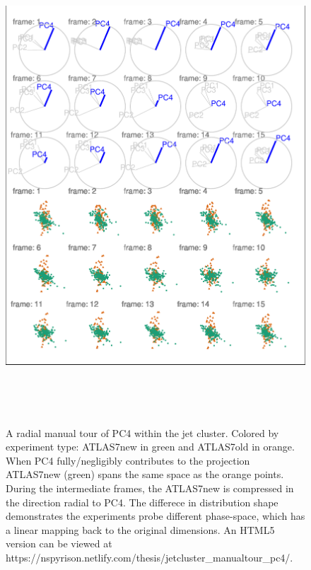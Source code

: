 \begin{Schunk}
\begin{figure}

{\centering \includegraphics[width=5.83in,height=7in]{spinifex_paper_files/figure-latex/JetClusterGood-1} 

}

\caption[A radial manual tour of PC4 within the jet cluster]{A radial manual tour of PC4 within the jet cluster. Colored by experiment type: ATLAS7new in green and ATLAS7old in orange. When PC4 fully/negligibly contributes to the projection ATLAS7new (green) spans the same space as the orange points. During the intermediate frames, the ATLAS7new is compressed in the direction radial to PC4. The differece in distribution shape demonstrates the experiments probe different phase-space, which has a linear mapping back to the original dimensions. An HTML5 version can be viewed at https://nspyrison.netlify.com/thesis/jetcluster\_manualtour\_pc4/.}\label{fig:JetClusterGood}
\end{figure}
\end{Schunk}


